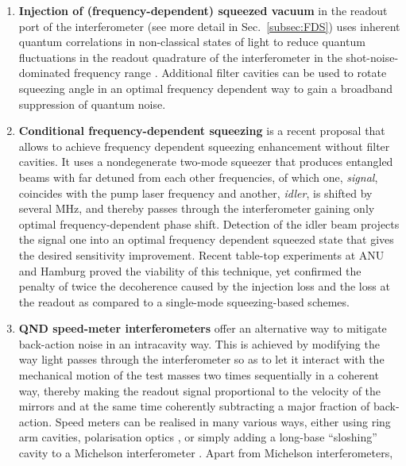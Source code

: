  \begin{enumerate}
 \item
 \textbf{Injection of (frequency-dependent) squeezed vacuum} in the readout port of the interferometer (see more detail in Sec.~\ref{subsec:FDS})
uses inherent quantum correlations in non-classical states of light to reduce quantum fluctuations in the readout quadrature of the interferometer 
in the shot-noise-dominated frequency range \cite{1981_PRD.23.1693_Caves,2011_Nat.Phys.7.962_LSC,Aasi2013NatPhot,Schnabel2017}. 
Additional filter cavities can be used to rotate squeezing angle in an optimal frequency dependent way \cite{KLMTV,2013_OE.21.30114_Loss_in_FC_Isogai,Oelker2016}
to gain a broadband suppression of quantum noise. 
\item
\textbf{Conditional frequency-dependent squeezing} \cite{Ma_NPhys_13_776_2017} is a recent proposal that allows to achieve frequency dependent 
squeezing enhancement without filter cavities. It uses a nondegenerate two-mode squeezer that produces entangled beams with far detuned from 
each other frequencies, of which one, \textit{signal}, coincides with the pump laser frequency and another, \textit{idler}, is shifted by several MHz, and thereby passes through 
the interferometer gaining only optimal frequency-dependent phase shift. Detection of the idler beam projects the signal one into an optimal frequency dependent 
squeezed state that gives the desired sensitivity improvement. Recent table-top experiments at ANU \cite{2019arXivEPRsqzANU} and Hamburg \cite{2019arXivEPRsqzHamburg}
proved the viability of this technique, yet confirmed the penalty of twice the decoherence caused by the injection loss and the loss at the readout as compared to a single-mode 
squeezing-based schemes.
\item
\textbf{QND speed-meter interferometers} \cite{00a1BrGoKhTh,02a2Kh,Purdue2001,Purdue2002,Chen2003,04a1Da} offer an alternative way to mitigate back-action noise in an intracavity way.
This is achieved by modifying the way light passes through the interferometer so as to let it interact with the mechanical motion of the test masses two times sequentially in a coherent way, 
thereby making the readout signal proportional to the velocity of the mirrors and at the same time coherently subtracting a major fraction of back-action. Speed meters can be realised in many 
various ways, either using ring arm cavities\cite{Chen2003,2014_CQG.31.215009_Graef}, polarisation optics \cite{Danilishin2004,PhysRevD.87.096008,PhysRevD.86.062001,2018_PCSM_danilishin,2017_Phys.Lett.A_EPR_SM}, or simply adding a long-base ``sloshing'' cavity to a Michelson interferometer \cite{Purdue2001,Purdue2002,2019arXiv190904185F}. Apart from Michelson interferometers,

\end{enumerate}
